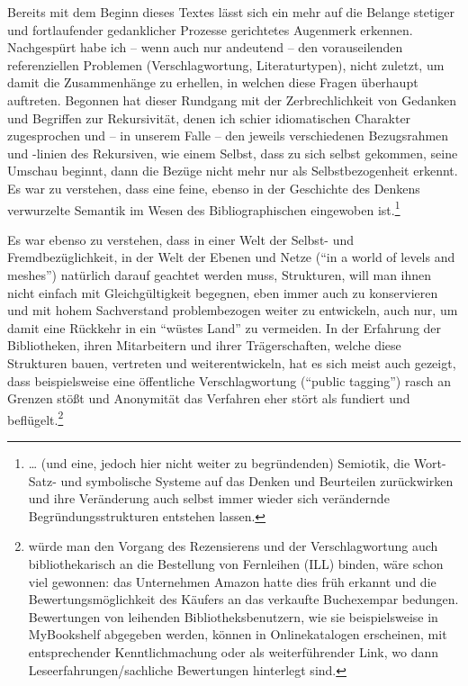 \documentclass[a4paper,
fontsize=11pt,
oneside,
numbers=noperiodatend,
parskip=half-,
bibliography=totoc,
final
]{scrartcl}
\begin{document}
Bereits mit dem Beginn dieses Textes lässt sich ein mehr auf die Belange
stetiger und fortlaufender gedanklicher Prozesse gerichtetes Augenmerk
erkennen. Nachgespürt habe ich -- wenn auch nur andeutend -- den
vorauseilenden referenziellen Problemen (Verschlagwortung,
Literaturtypen), nicht zuletzt, um damit die Zusammenhänge zu erhellen,
in welchen diese Fragen überhaupt auftreten. Begonnen hat dieser
Rundgang mit der Zerbrechlichkeit von Gedanken und Begriffen zur
Rekursivität, denen ich schier idiomatischen Charakter zugesprochen und
-- in unserem Falle -- den jeweils verschiedenen Bezugsrahmen und
-linien des Rekursiven, wie einem Selbst, dass zu sich selbst gekommen,
seine Umschau beginnt, dann die Bezüge nicht mehr nur als
Selbstbezogenheit erkennt. Es war zu verstehen, dass eine feine, ebenso
in der Geschichte des Denkens verwurzelte Semantik im Wesen des
Bibliographischen eingewoben ist.\footnote{\ldots{} (und eine, jedoch
  hier nicht weiter zu begründenden) Semiotik, die Wort- Satz- und
  symbolische Systeme auf das Denken und Beurteilen zurückwirken und
  ihre Veränderung auch selbst immer wieder sich verändernde
  Begründungsstrukturen entstehen lassen.}

Es war ebenso zu verstehen, dass in einer Welt der Selbst- und
Fremdbezüglichkeit, in der Welt der Ebenen und Netze (\enquote{in a
world of levels and meshes}) natürlich darauf geachtet werden muss,
Strukturen, will man ihnen nicht einfach mit Gleichgültigkeit begegnen,
eben immer auch zu konservieren und mit hohem Sachverstand
problembezogen weiter zu entwickeln, auch nur, um damit eine Rückkehr in
ein \enquote{wüstes Land} zu vermeiden. In der Erfahrung der
Bibliotheken, ihren Mitarbeitern und ihrer Trägerschaften, welche diese
Strukturen bauen, vertreten und weiterentwickeln, hat es sich meist auch
gezeigt, dass beispielsweise eine öffentliche Verschlagwortung
(\enquote{public tagging}) rasch an Grenzen stößt und Anonymität das
Verfahren eher stört als fundiert und beflügelt.\footnote{würde man den
  Vorgang des Rezensierens und der Verschlagwortung auch
  bibliothekarisch an die Bestellung von Fernleihen (ILL) binden, wäre
  schon viel gewonnen: das Unternehmen Amazon hatte dies früh erkannt
  und die Bewertungsmöglichkeit des Käufers an das verkaufte Buchexempar
  bedungen. Bewertungen von leihenden Bibliotheksbenutzern, wie sie
  beispielsweise in MyBookshelf abgegeben werden, können in
  Onlinekatalogen erscheinen, mit entsprechender Kenntlichmachung oder
  als weiterführender Link, wo dann Leseerfahrungen/sachliche
  Bewertungen hinterlegt sind.}
\end{document}
